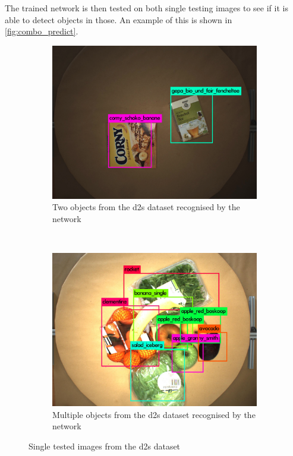 The trained network is then tested on both single testing images to see if it is able to detect objects in those. An example of this is shown in \autoref{fig:combo_predict}.

\begin{figure}[H]
	\centering
	\begin{subfigure}[b]{0.45\textwidth}
		\includegraphics[width=\textwidth]{figures/result_2_obj}
		\caption{Two objects from the \gls{d2s} dataset recognised by the network}
		\label{fig:result_2_obj}
	\end{subfigure}
	~
	\begin{subfigure}[b]{0.45\textwidth}
		\includegraphics[width=\textwidth]{figures/predictions_mass}
		\caption{Multiple objects from the \gls{d2s} dataset recognised by the network}
		\label{fig:pred_mass}
	\end{subfigure}
	\caption{Single tested images from the \gls{d2s} dataset}
	\label{fig:combo_predict}
\end{figure}

